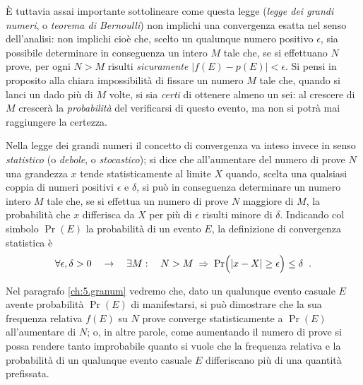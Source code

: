 \`E tuttavia assai importante sottolineare come questa legge
(\emph{legge dei grandi numeri}, o \emph{teorema di
  Bernoulli}) non implichi una convergenza esatta nel senso
dell'analisi: non implichi cio\`e che, scelto un qualunque
numero positivo $\epsilon$, sia possibile determinare in
conseguenza un intero $M$ tale che, se si effettuano $N$
prove, per ogni $N>M$ risulti \emph{sicuramente} $|f(E) -
p(E)| < \epsilon$.  Si pensi in proposito alla chiara
impossibilit\`a di fissare un numero $M$ tale che, quando si
lanci un dado pi\`u di $M$ volte, si sia \emph{certi} di
ottenere almeno un sei: al crescere di $M$ crescer\`a la
\emph{probabilit\`a} del verificarsi di questo evento, ma
non si potr\`a mai raggiungere la certezza.

Nella legge dei grandi numeri il concetto di convergenza va
inteso invece in senso \emph{statistico} (o \emph{debole}, o
\emph{stocastico}); si dice che all'aumentare del numero di
prove $N$ una grandezza $x$ tende statisticamente al limite
$X$ quando, scelta una qualsiasi coppia di numeri positivi
$\epsilon$ e $\delta$, si pu\`o in conseguenza determinare
un numero intero $M$ tale che, se si effettua un numero di
prove $N$ maggiore di $M$, la probabilit\`a che $x$
differisca da $X$ per pi\`u di $\epsilon$ risulti minore di
$\delta$.  Indicando col simbolo $\Pr(E)$ la probabilit\`a
di un evento $E$, la definizione di convergenza statistica
\`e
\begin{equation} \label{eq:3.limsta}
  \forall \epsilon, \delta > 0 \quad \rightarrow
  \quad \exists M : \quad N > M \; \Rightarrow \;
  \Pr \Bigl( | x - X | \geq \epsilon \Bigr) \leq
  \delta \;\; .
\end{equation}

Nel paragrafo \ref{ch:5.granum} vedremo che, dato un
qualunque evento casuale $E$ avente probabilit\`a $\Pr(E)$
di manifestarsi, si pu\`o dimostrare che la sua frequenza
relativa $f(E)$ su $N$ prove converge statisticamente a
$\Pr(E)$ all'aumentare di $N$; o, in altre parole, come
aumentando il numero di prove si possa rendere tanto
improbabile quanto si vuole che la frequenza relativa e la
probabilit\`a di un qualunque evento casuale $E$
differiscano pi\`u di una quantit\`a
prefissata.%
%

\endinput
